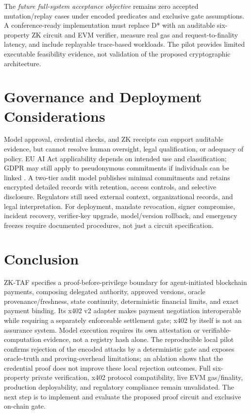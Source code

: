 \documentclass[conference]{IEEEtran}
\newcommand{\zktaf}{\textsc{ZK-TAF}}
\begin{document}
The \emph{future full-system acceptance objective} remains zero accepted mutation/replay cases under encoded predicates and exclusive gate assumptions. A conference-ready implementation must replace D* with an auditable six-property ZK circuit and EVM verifier, measure real gas and request-to-finality latency, and include replayable trace-based workloads. The pilot provides limited executable feasibility evidence, not validation of the proposed cryptographic architecture.

\section{Governance and Deployment Considerations}
Model approval, credential checks, and ZK receipts can support auditable evidence, but cannot resolve human oversight, legal qualification, or adequacy of policy. EU AI Act applicability depends on intended use and classification; GDPR may still apply to pseudonymous commitments if individuals can be linked \cite{aiact2024,gdpr2016}. A two-tier audit model publishes minimal commitments and retains encrypted detailed records with retention, access controls, and selective disclosure. Regulators still need external context, organizational records, and legal interpretation. For deployment, mandate revocation, signer compromise, incident recovery, verifier-key upgrade, model/version rollback, and emergency freezes require documented procedures, not just a circuit specification.

\section{Conclusion}
\zktaf{} specifies a proof-before-privilege boundary for agent-initiated blockchain payments, composing delegated authority, approved versions, oracle provenance/freshness, state continuity, deterministic financial limits, and exact payment binding. Its x402 v2 adapter makes payment negotiation interoperable while requiring a separately enforceable settlement gate; x402 by itself is not an assurance system. Model execution requires its own attestation or verifiable-computation evidence, not a registry hash alone. The reproducible local pilot confirms rejection of the encoded attacks by a deterministic gate and exposes oracle-truth and proving-overhead limitations; an ablation shows that the credential proof does not improve these local rejection outcomes. Full six-property private verification, x402 protocol compatibility, live EVM gas/finality, production deployability, and regulatory compliance remain unvalidated. The next step is to implement and evaluate the proposed proof circuit and exclusive on-chain gate.

\printbibliography
\end{document}
